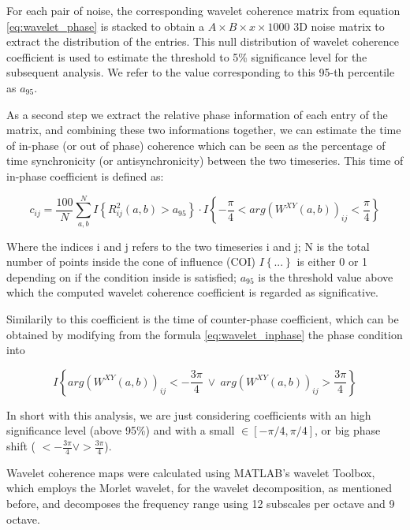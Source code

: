\documentclass[11pt]{report}
\begin{document}
For each pair of noise, the corresponding wavelet coherence matrix from equation \ref{eq:wavelet_phase} is stacked to obtain a $A\times B \times x \times 1000$ 3D noise matrix to extract the distribution of the entries.
This null distribution of wavelet coherence coefficient is used to estimate the threshold to 5\% significance level for the subsequent analysis.
We refer to the value corresponding to this 95-th percentile as $a_{95}$.


As a second step we extract the relative phase information of each entry of the matrix, and combining these two informations together, we can estimate the time of in-phase (or out of phase) coherence which can be seen as the percentage of time synchronicity (or antisynchronicity) between the two timeseries. \cite{bernas-2018}
This time of in-phase coefficient is defined as:

\begin{equation} \label{eq:wavelet_inphase}
c_{ij} = \frac{100}{N}\sum_{a, b}^N I\left\{ R_{ij}^2(a,b) > a_{95}\right\}\cdot I\left\{-\frac{\pi}{4}<arg(W^{XY}(a, b))_{ij} < \frac{\pi}{4}  \right\}
\end{equation}

Where the indices i and j refers to the two timeseries i and j; N is the total number of points inside the cone of influence (COI) $I\left\{ ...\right\}$ is either 0 or 1 depending on if the condition inside is satisfied; $a_{95}$ is the threshold value above which the computed wavelet coherence coefficient is regarded as significative.

Similarily to this coefficient is the time of counter-phase coefficient, which can be obtained by modifying from the formula \ref{eq:wavelet_inphase} the phase condition into

\[
I\left\{arg(W^{XY}(a, b))_{ij} < -\frac{3\pi}{4} \ \lor \ arg (W^{XY}(a, b))_{ij} >\frac{3\pi}{4} \right\}
\]

In short with this analysis, we are just considering coefficients with an high significance level (above 95\%) and with a small $\in [-\pi/4, \pi/4]$, or big phase shift ( $< -\frac{3\pi}{4}  \lor  >\frac{3 \pi}{4}$).

Wavelet coherence maps were calculated using MATLAB's wavelet Toolbox, which employs the Morlet wavelet, for the wavelet decomposition, as  mentioned before, and decomposes the frequency range using 12 subscales per octave and 9 octave.

\end{document}
